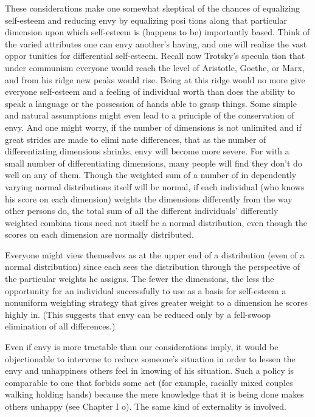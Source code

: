 \documentclass[11pt,openany]{book}
\begin{document}
These considerations make one somewhat skeptical of the chances of equalizing self-esteem and reducing envy by equalizing posi tions along that particular dimension upon which self-esteem is (happens to be) importantly based. Think of the varied attributes one can envy another's having, and one will realize the vast oppor tunities for differential self-esteem. Recall now Trotsky's specula tion that under communism everyone would reach the level of Aristotle, Goethe, or Marx, and from his ridge new peaks would rise. Being at this ridge would no more give everyone self-esteem and a feeling of individual worth than does the ability to speak a language or the possession of hands able to grasp things. Some simple and natural assumptions might even lead to a principle of the conservation of envy. And one might worry, if the number of dimensions is not unlimited and if great strides are made to elimi nate differences, that as the number of differentiating dimensions shrinks, envy will become more severe. For with a small number of differentiating dimensions, many people will find they don't do well on any of them. Though the weighted sum of a number of in dependently varying normal distributions itself will be normal, if each individual (who knows his score on each dimension) weights the dimensions differently from the way other persons do, the total sum of all the different individuals' differently weighted combina tions need not itself be a normal distribution, even though the scores on each dimension are normally distributed. 

Everyone might view themselves as at the upper end of a distribution (even of a normal distribution) since each sees the distribution through the perspective of the particular weights he assigns. The fewer the dimensions, the less the opportunity for an individual successfully to use as a basis for self-esteem a nonuniform weighting strategy that gives greater weight to a dimension he scores highly in. (This suggests that envy can be reduced only by a fell-swoop elimination of all differences.) 

Even if envy is more tractable than our considerations imply, it would be objectionable to intervene to reduce someone's situation in order to lessen the envy and unhappiness others feel in knowing of his situation. Such a policy is comparable to one that forbids some act (for example, racially mixed couples walking holding hands) because the mere knowledge that it is being done makes others unhappy (see Chapter I o). The same kind of externality is involved. 
\end{document}
